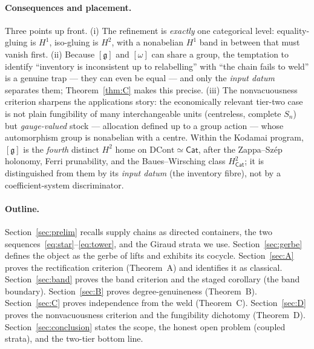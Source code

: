 \documentclass[11pt]{article}
\theoremstyle{definition}
\newcommand{\Cat}{\mathsf{Cat}}
\newcommand{\gerbe}{\mathfrak{g}}
\begin{document}
\paragraph{Consequences and placement.}
Three points up front. (i) The refinement is \emph{exactly} one categorical level: equality-gluing
is $H^1$, iso-gluing is $H^2$, with a nonabelian $H^1$ band in between that must vanish first.
(ii) Because $[\gerbe]$ and $[\omega]$ can share a group, the temptation to identify ``inventory
is inconsistent up to relabelling'' with ``the chain fails to weld'' is a genuine trap ---
they can even be equal --- and only the \emph{input datum} separates them; Theorem~\ref{thm:C}
makes this precise. (iii) The nonvacuousness criterion sharpens the applications story: the
economically relevant tier-two case is not plain fungibility of many interchangeable units
(centreless, complete $S_n$) but \emph{gauge-valued} stock --- allocation defined up to a group
action --- whose automorphism group is nonabelian with a centre. Within the Kodamai program,
$[\gerbe]$ is the \emph{fourth} distinct $H^2$ home on $\mathrm{DCont}\simeq\Cat$, after the
Zappa--Sz\'ep holonomy, Ferri prunability, and the Baues--Wirsching class $H^2_{\Cat}$;
it is distinguished from them by its \emph{input datum} (the inventory fibre), not by a
coefficient-system discriminator.

\paragraph{Outline.}
Section~\ref{sec:prelim} recalls supply chains as directed containers, the two
sequences~\eqref{eq:star}--\eqref{eq:tower}, and the Giraud strata we use.
Section~\ref{sec:gerbe} defines the object as the gerbe of lifts and exhibits its cocycle.
Section~\ref{sec:A} proves the rectification criterion (Theorem~A) and identifies it as classical.
Section~\ref{sec:band} proves the band criterion and the staged corollary (the band boundary).
Section~\ref{sec:B} proves degree-genuineness (Theorem~B). Section~\ref{sec:C} proves independence
from the weld (Theorem~C). Section~\ref{sec:D} proves the nonvacuousness criterion and the
fungibility dichotomy (Theorem~D). Section~\ref{sec:conclusion} states the scope, the honest open
problem (coupled strata), and the two-tier bottom line.
\end{document}
